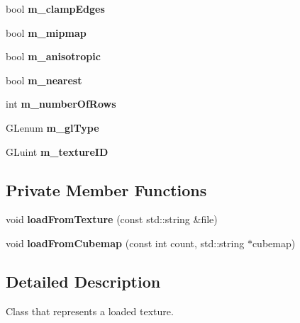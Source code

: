\begin{DoxyCompactItemize}
bool {\bfseries m\+\_\+clamp\+Edges}
\item 
\mbox{\label{classflounder_1_1texture_a54639365a71391cc144fe4ebeaf1e39c}} 
bool {\bfseries m\+\_\+mipmap}
\item 
\mbox{\label{classflounder_1_1texture_a68c7e5491756ff6d61195dcc0e19da3b}} 
bool {\bfseries m\+\_\+anisotropic}
\item 
\mbox{\label{classflounder_1_1texture_a13c3515a014252220abfbf8c302e195b}} 
bool {\bfseries m\+\_\+nearest}
\item 
\mbox{\label{classflounder_1_1texture_af1e32e208f02390ec44941e989b5fca8}} 
int {\bfseries m\+\_\+number\+Of\+Rows}
\item 
\mbox{\label{classflounder_1_1texture_a3d36cadbf7f7aa9d8e2d8b9ffc2a267c}} 
G\+Lenum {\bfseries m\+\_\+gl\+Type}
\item 
\mbox{\label{classflounder_1_1texture_a0ad04565d8bacdc63a49076e7e0de5f2}} 
G\+Luint {\bfseries m\+\_\+texture\+ID}
\end{DoxyCompactItemize}
\subsection*{Private Member Functions}
\begin{DoxyCompactItemize}
\item 
\mbox{\label{classflounder_1_1texture_a4709b913a032bdcc66e309d39254e923}} 
void {\bfseries load\+From\+Texture} (const std\+::string \&file)
\item 
\mbox{\label{classflounder_1_1texture_aa9703d5d5d76227387a0edfd28503238}} 
void {\bfseries load\+From\+Cubemap} (const int count, std\+::string $\ast$cubemap)
\end{DoxyCompactItemize}


\subsection{Detailed Description}
Class that represents a loaded texture. 




